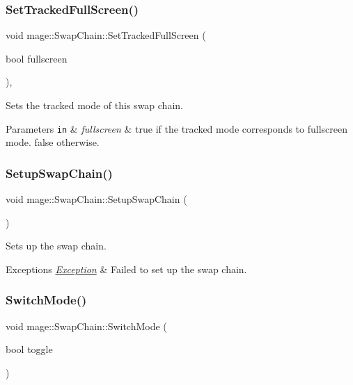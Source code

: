 \subsubsection{\texorpdfstring{Set\+Tracked\+Full\+Screen()}{SetTrackedFullScreen()}}
{\footnotesize\ttfamily void mage\+::\+Swap\+Chain\+::\+Set\+Tracked\+Full\+Screen (\begin{DoxyParamCaption}\item[{bool}]{fullscreen }\end{DoxyParamCaption})\hspace{0.3cm}{\ttfamily [private]}, {\ttfamily [noexcept]}}

Sets the tracked mode of this swap chain.


\begin{DoxyParams}[1]{Parameters}
\mbox{\tt in}  & {\em fullscreen} & {\ttfamily true} if the tracked mode corresponds to fullscreen mode. {\ttfamily false} otherwise. \\
\hline
\end{DoxyParams}
\hypertarget{classmage_1_1_swap_chain_aec2b14bc569046174f6a416a7f20c8d5}{}\label{classmage_1_1_swap_chain_aec2b14bc569046174f6a416a7f20c8d5} 
\subsubsection{\texorpdfstring{Setup\+Swap\+Chain()}{SetupSwapChain()}}
{\footnotesize\ttfamily void mage\+::\+Swap\+Chain\+::\+Setup\+Swap\+Chain (\begin{DoxyParamCaption}{ }\end{DoxyParamCaption})\hspace{0.3cm}{\ttfamily [private]}}

Sets up the swap chain.


\begin{DoxyExceptions}{Exceptions}
{\em \hyperlink{classmage_1_1_exception}{Exception}} & Failed to set up the swap chain. \\
\hline
\end{DoxyExceptions}
\hypertarget{classmage_1_1_swap_chain_ada1b8857eeac3d00287fb624645e365e}{}\label{classmage_1_1_swap_chain_ada1b8857eeac3d00287fb624645e365e} 
\subsubsection{\texorpdfstring{Switch\+Mode()}{SwitchMode()}}
{\footnotesize\ttfamily void mage\+::\+Swap\+Chain\+::\+Switch\+Mode (\begin{DoxyParamCaption}\item[{bool}]{toggle }\end{DoxyParamCaption})}


